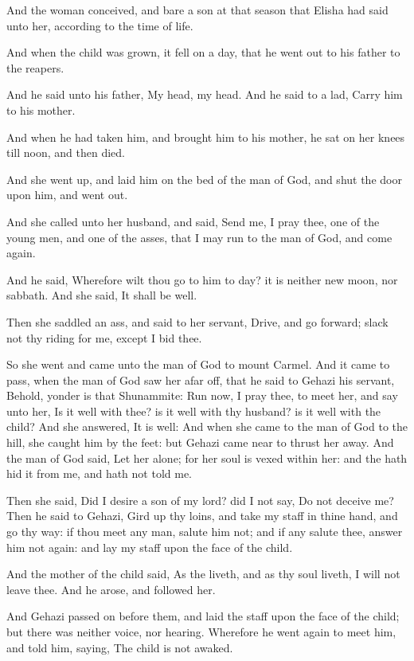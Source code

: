 \verse And the woman conceived, and bare a son at that season that Elisha had said unto her, according to the time of life.

\verse And when the child was grown, it fell on a day, that he went out to his father to the reapers.

\verse And he said unto his father, My head, my head. And he said to a lad, Carry him to his mother.

\verse And when he had taken him, and brought him to his mother, he sat on her knees till noon, and then died.

\verse And she went up, and laid him on the bed of the man of God, and shut the door upon him, and went out.

\verse And she called unto her husband, and said, Send me, I pray thee, one of the young men, and one of the asses, that I may run to the man of God, and come again.

\verse And he said, Wherefore wilt thou go to him to day? it is neither new moon, nor sabbath. And she said, It shall be well.

\verse Then she saddled an ass, and said to her servant, Drive, and go forward; slack not thy riding for me, except I bid thee.

\verse So she went and came unto the man of God to mount Carmel. And it came to pass, when the man of God saw her afar off, that he said to Gehazi his servant, Behold, yonder is that Shunammite: \verse Run now, I pray thee, to meet her, and say unto her, Is it well with thee? is it well with thy husband? is it well with the child? And she answered, It is well: \verse And when she came to the man of God to the hill, she caught him by the feet: but Gehazi came near to thrust her away. And the man of God said, Let her alone; for her soul is vexed within her: and the \LORD hath hid it from me, and hath not told me.

\verse Then she said, Did I desire a son of my lord? did I not say, Do not deceive me?  \verse Then he said to Gehazi, Gird up thy loins, and take my staff in thine hand, and go thy way: if thou meet any man, salute him not; and if any salute thee, answer him not again: and lay my staff upon the face of the child.

\verse And the mother of the child said, As the \LORD liveth, and as thy soul liveth, I will not leave thee. And he arose, and followed her.

\verse And Gehazi passed on before them, and laid the staff upon the face of the child; but there was neither voice, nor hearing. Wherefore he went again to meet him, and told him, saying, The child is not awaked.

